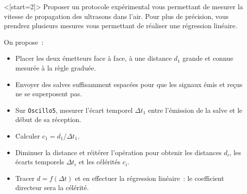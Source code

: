\documentclass[../main/main.tex]{subfiles}
\begin{document}

\QR<[start=2]>{%
	Proposer un protocole expérimental vous permettant de mesurer la
	vitesse de propagation des ultrasons dans l'air. Pour plus de précision,
	vous prendrez plusieurs mesures vous permettant de réaliser une
	régression linéaire.
}{%
	On propose~:
	\begin{itemize}
		\item Placer les deux émetteurs face à face, à une distance $d_1$ grande et
		      connue mesurée à la règle graduée.
		\item Envoyer des salves suffisamment espacées pour que les signaux émis et
		      reçus ne se superposent pas.
		\item Sur \texttt{Oscillo5}, mesurer l'écart temporel $\Delta{t_1}$ entre
		      l'émission de la salve et le début de sa réception.
		\item Calculer $c_1 = d_1/\Delta{t_1}$.
		\item Diminuer la distance et réitérer l'opération pour obtenir les
		      distances $d_i$, les écarts temporels $\Delta{t_i}$ et les célérités
		      $c_i$.
		\item Tracer $d = f(\Delta{t})$ et en effectuer la régression linéaire~: le
		      coefficient directeur sera la célérité.
	\end{itemize}
}

\end{document}
